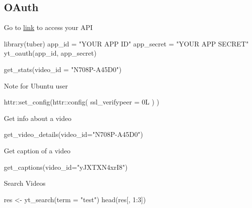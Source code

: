 \documentclass[
]{book}
\newenvironment{Shaded}{\begin{snugshade}}{\end{snugshade}}
\newcommand{\AttributeTok}[1]{\textcolor[rgb]{0.77,0.63,0.00}{#1}}
\newcommand{\DecValTok}[1]{\textcolor[rgb]{0.00,0.00,0.81}{#1}}
\newcommand{\FunctionTok}[1]{\textcolor[rgb]{0.00,0.00,0.00}{#1}}
\newcommand{\NormalTok}[1]{#1}
\newcommand{\OtherTok}[1]{\textcolor[rgb]{0.56,0.35,0.01}{#1}}
\newcommand{\SpecialCharTok}[1]{\textcolor[rgb]{0.00,0.00,0.00}{#1}}
\newcommand{\StringTok}[1]{\textcolor[rgb]{0.31,0.60,0.02}{#1}}
\begin{document}
\hypertarget{oauth}{%
\subsection{OAuth}\label{oauth}}

Go to \href{https://console.cloud.google.com/apis/api/youtube.googleapis.com}{link} to access your API

\begin{Shaded}
\begin{Highlighting}[]
\FunctionTok{library}\NormalTok{(tuber)}
\NormalTok{app\_id }\OtherTok{=} \StringTok{"YOUR APP ID"}
\NormalTok{app\_secret }\OtherTok{=} \StringTok{"YOUR APP SECRET"}
\FunctionTok{yt\_oauth}\NormalTok{(app\_id, app\_secret)}


\FunctionTok{get\_stats}\NormalTok{(}\AttributeTok{video\_id =} \StringTok{"N708P{-}A45D0"}\NormalTok{)}
\end{Highlighting}
\end{Shaded}

Note for Ubuntu user

\begin{Shaded}
\begin{Highlighting}[]
\NormalTok{httr}\SpecialCharTok{::}\FunctionTok{set\_config}\NormalTok{(httr}\SpecialCharTok{::}\FunctionTok{config}\NormalTok{( }\AttributeTok{ssl\_verifypeer =}\NormalTok{ 0L ) )}
\end{Highlighting}
\end{Shaded}

Get info about a video

\begin{Shaded}
\begin{Highlighting}[]
\FunctionTok{get\_video\_details}\NormalTok{(}\AttributeTok{video\_id=}\StringTok{"N708P{-}A45D0"}\NormalTok{)}
\end{Highlighting}
\end{Shaded}

Get caption of a video

\begin{Shaded}
\begin{Highlighting}[]
\FunctionTok{get\_captions}\NormalTok{(}\AttributeTok{video\_id=}\StringTok{"yJXTXN4xrI8"}\NormalTok{)}
\end{Highlighting}
\end{Shaded}

Search Videos

\begin{Shaded}
\begin{Highlighting}[]
\NormalTok{res }\OtherTok{\textless{}{-}} \FunctionTok{yt\_search}\NormalTok{(}\AttributeTok{term =} \StringTok{"test"}\NormalTok{)}
\FunctionTok{head}\NormalTok{(res[, }\DecValTok{1}\SpecialCharTok{:}\DecValTok{3}\NormalTok{])}
\end{Highlighting}
\end{Shaded}
\end{document}
